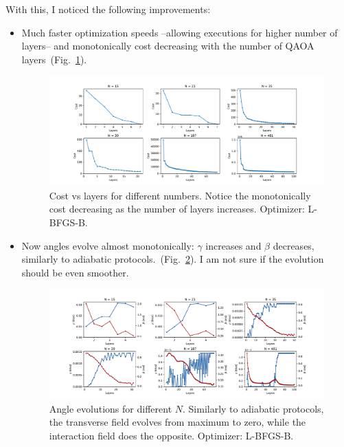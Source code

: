 \documentclass[12pt, letterpaper]{article}
\begin{document}
With this, I noticed the following improvements:
\begin{itemize}
    \item Much faster optimization speeds --allowing executions for higher number of layers-- and monotonically
    cost decreasing with the number of QAOA layers~(Fig.~\ref{fig:cost_layers}).
    \begin{figure}[h]
        \centering
        \includegraphics[width=1\textwidth]{cost_layers.pdf}
        \caption{Cost vs layers for different numbers. Notice the monotonically cost decreasing
        as the number of layers increases. Optimizer: L-BFGS-B.}
        \label{fig:cost_layers}
    \end{figure}
    
    \item Now angles evolve almost monotonically: $\gamma$ increases and $\beta$ decreases, similarly
    to adiabatic protocols.~(Fig.~\ref{fig:angle_evolution}). I am not sure if the evolution
    should be even smoother.
    \begin{figure}[h]
        \centering
        \includegraphics[width=1\textwidth]{angle_evolution.pdf}
        \caption{Angle evolutions for different $N$. Similarly to adiabatic protocols,
        the transverse field evolves from maximum to zero, while the interaction field
        does the opposite. Optimizer: L-BFGS-B.}
        \label{fig:angle_evolution}
    \end{figure}


\end{itemize}
\end{document}
